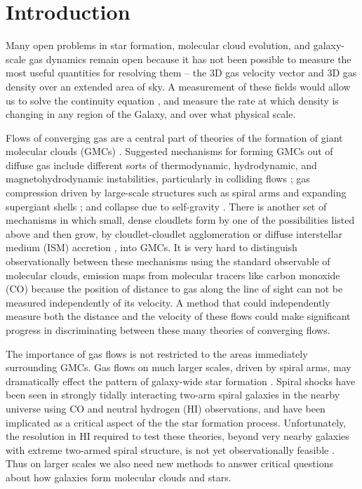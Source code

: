 \section{Introduction}
Many open problems in star formation, molecular cloud evolution, and galaxy-scale gas dynamics remain open because it has not been possible to measure the most useful quantities for resolving them -- the 3D gas velocity vector and 3D gas density over an extended area of sky. A measurement of these fields would allow us to solve the continuity equation \cite{euler1757principes}, and measure the rate at which density is changing in any region of the Galaxy, and over what physical scale. 

Flows of converging gas are a central part of theories of the formation of giant molecular clouds (GMCs) \cite{Vazquez_Semadeni_2007,Audit_2005}. Suggested mechanisms for forming GMCs out of diffuse gas include different sorts of thermodynamic, hydrodynamic, and magnetohydrodynamic instabilities, particularly in colliding flows \citep{Clark:2012bq,2014ApJ...790...37C,Heitsch06}; gas compression driven by large-scale structures such as spiral arms and expanding supergiant shells \citep{Roberts:1972bp,Bonnell:2006hn,Fujimoto:2014kh}; and collapse due to self-gravity \citep{Kim:2002da,2012MNRAS.425.2157D,VazquezSemadeni:2007cj}.
There is another set of mechanisms in which small, dense cloudlets form by one of the possibilities listed above and then grow, by cloudlet-cloudlet agglomeration \citep{Roberts:1987eb,Dobbs:2008ez,Tasker:2009gc} or diffuse interstellar medium (ISM) accretion \citep{Goldbaum:2011kj,Heitsch:2013jp}, into GMCs. It is very hard to distinguish observationally between these mechanisms using the standard observable of molecular clouds, emission maps from molecular tracers like carbon monoxide (CO) because the position of distance to gas along the line of sight can not be measured independently of its velocity. A method that could independently measure both the distance and the velocity of these flows could make significant progress in discriminating between these many theories of converging flows.

The importance of gas flows is not restricted to the areas immediately surrounding GMCs. Gas flows on much larger scales, driven by spiral arms, may dramatically effect the pattern of galaxy-wide star formation \cite{Roberts_1972,Bonnell_2006}. Spiral shocks have been seen in strongly tidally interacting two-arm spiral galaxies in the nearby universe \cite{Visser:1980vc,Visser:1980ud,Shetty_2007} using CO and neutral hydrogen (HI) observations, and have been implicated as a critical aspect of the the star formation process. Unfortunately, the resolution in HI required to test these theories, beyond very nearby galaxies with extreme two-armed spiral structure, is not yet observationally feasible \cite{Visser:1980ud}. Thus on larger scales we also need new methods to answer critical questions about how galaxies form molecular clouds and stars. 

